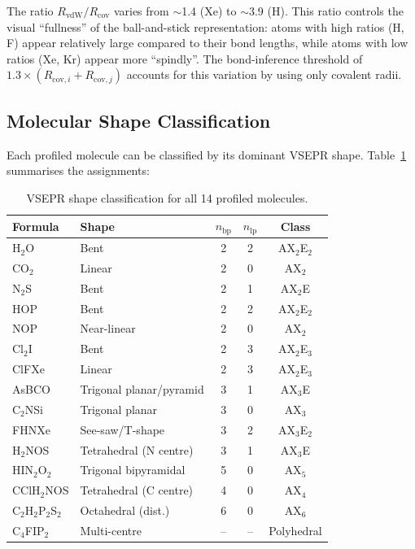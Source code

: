 \documentclass[11pt,a4paper]{article}
\begin{document}
\noindent The ratio $R_{\text{vdW}} / R_{\text{cov}}$ varies from
$\sim$1.4 (Xe) to $\sim$3.9 (H).  This ratio controls the visual
``fullness'' of the ball-and-stick representation: atoms with high
ratios (H, F) appear relatively large compared to their bond lengths,
while atoms with low ratios (Xe, Kr) appear more ``spindly''.  The
bond-inference threshold of $1.3 \times (R_{\text{cov},i} + R_{\text{cov},j})$
accounts for this variation by using only covalent radii.

\subsection{Molecular Shape Classification}

Each profiled molecule can be classified by its dominant VSEPR shape.
Table~\ref{tab:vsepr_classification} summarises the assignments:

\begin{table}[H]
\centering
\caption{VSEPR shape classification for all 14 profiled molecules.}
\label{tab:vsepr_classification}
\begin{tabular}{llccc}
\toprule
\textbf{Formula} & \textbf{Shape} & \textbf{$n_{\text{bp}}$}
  & \textbf{$n_{\text{lp}}$} & \textbf{Class} \\
\midrule
H$_2$O           & Bent                    & 2 & 2 & AX$_2$E$_2$ \\
CO$_2$           & Linear                  & 2 & 0 & AX$_2$ \\
N$_2$S           & Bent                    & 2 & 1 & AX$_2$E \\
HOP              & Bent                    & 2 & 2 & AX$_2$E$_2$ \\
NOP              & Near-linear             & 2 & 0 & AX$_2$ \\
Cl$_2$I          & Bent                    & 2 & 3 & AX$_2$E$_3$ \\
ClFXe            & Linear                  & 2 & 3 & AX$_2$E$_3$ \\
AsBCO            & Trigonal planar/pyramid & 3 & 1 & AX$_3$E \\
C$_2$NSi         & Trigonal planar         & 3 & 0 & AX$_3$ \\
FHNXe            & See-saw/T-shape         & 3 & 2 & AX$_3$E$_2$ \\
H$_2$NOS         & Tetrahedral (N centre)  & 3 & 1 & AX$_3$E \\
HIN$_2$O$_2$     & Trigonal bipyramidal    & 5 & 0 & AX$_5$ \\
CClH$_2$NOS      & Tetrahedral (C centre)  & 4 & 0 & AX$_4$ \\
C$_2$H$_2$P$_2$S$_2$ & Octahedral (dist.) & 6 & 0 & AX$_6$ \\
C$_4$FIP$_2$     & Multi-centre            & -- & -- & Polyhedral \\
\bottomrule
\end{tabular}
\end{table}
\end{document}
